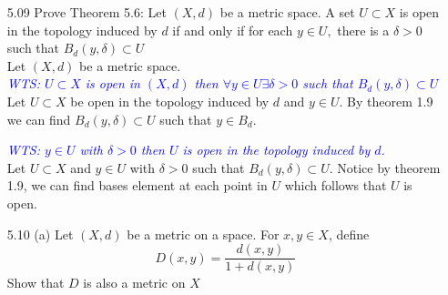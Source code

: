 \documentclass[12pt]{article}
\newcommand{\wts}[1]{\textit{\textcolor{blue}{WTS: #1}}\\}
\newcommand{\1}{^{-1}}
\begin{document}
\begin{enumerate}
	 (ii) \wts{$\forall x,y \in X,  d(x,y) = d(y,x) $}
	 Let $ x,y\in X $. Consider the following two cases:\\
	 \\
	 Case 1: $ d(x,y) = 1 = d(y,x) $\\
	 Case 2: $ d(x,y) = 0  = d(y,x) $\\
	 \\
	 	Thus, in both cases $ d(x,y)= d(y,x)$\\
	 \\
	 (iii) \wts{$ \forall x,y,z \in X, d(x,y)+d(y,z) \geq d(x,z)$}
	 Let $ x,y,z \in X $. Consider the following:\\
	 \\
	 Case 1: $ x \neq y \neq z \implies  d(x,y)+d(y,z)= 2 \geq d(x,z) = 1 \implies 2 \geq 1$\\
	 Case 2: $ y = x \text{ or } y = z  \implies d(x,y)+d(y,z) = 1 \geq d(x,z) = 1 \implies 1 \geq 1$\\
	 Case 3: $ x = z \implies d(x,y)+d(y,z) = 2 \text{ or } 1\geq d(x,z) \implies  2\text{ or } 1\geq 0$\\
	 Case 4: $ x = y = z \implies d(x,y)+d(y,z) = 0 \geq d(x,z) = 0 \implies 0 \geq 0$\\
	 \\
	 Thus, all cases hold.\\
	 \\
	 Therefore, the three conditions of a metric are satisfied and $d$ is a metric.\\
	 \\
	 This is the discrete metric.
	\item[5.09] Prove Theorem 5.6: Let $(X, d)$ be a metric space. A set $U \subset X$ is open in the topology induced by $d$ if and only if for each $y \in U,$ there is a $\delta>0$ such that $B_{d}(y, \delta) \subset U$\\
	Let $ (X,d) $ be a metric space.\\
	\wts{$ U \subset X $ is open in $ (X,d) $ then $ \forall y\in U \exists \delta > 0 $ such that $B_d(y,\delta)\subset U$}
	Let $ U\subset X $ be open in the topology induced by $ d $ and $ y \in U $. By theorem 1.9 we can find $ B_d(y,\delta) \subset U $ such that $ y\in B_d$. 
	
	\wts{$ y \in U $ with $ \delta > 0 $ then $ U $ is open in the topology induced by $ d $.}
	Let $ U \subset X $ and $ y\in U $ with $ \delta > 0 $ such that $ B_d(y,\delta)\subset U $. Notice by theorem 1.9, we can find bases element at each point in $ U $ which follows that $ U $ is open. 	
	\item[5.10] (a) Let $(X, d)$ be a metric on a space. For $x, y \in X$, define
	$$
	D(x, y)=\frac{d(x, y)}{1+d(x, y)}
	$$
	Show that $D$ is also a metric on $X$\\
	

\end{enumerate}
\end{document}
